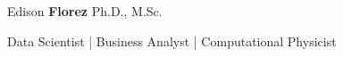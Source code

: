 \begin{center}
    {\fontsize{50}{40}\selectfont Edison \textbf{Florez}}
    \hspace*{5mm}
    {\fontsize{20}{40}\selectfont Ph.D., M.Sc.}

    \vspace*{3mm}
    \Large{
        Data Scientist | Business Analyst | Computational Physicist
    }
\end{center}
